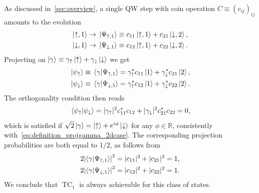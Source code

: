 \documentclass[
	aps, pra,
	superscriptaddress, twocolumn,
	floatfix,
	10pt
]{revtex4-1}
\newcommand{\on}[1]{\operatorname{#1}}
\newcommand{\parTitle}[1]{\noindent{\color{Mahogany}(\emph{#1})}}
\newcommand{\RR}{\mathbb{R}}
\newcommand{\calW}{{\mathcal{W}}}
\begin{document}
\parTitle{Single step}
As discussed in~\cref{sec:overview}, a single QW step with coin operation  $C\equiv (c_{ij})_{ij}$ amounts to the evolution
\begin{equation}
\begin{aligned}
	\ket{\uparrow,1} &\rightarrow \ket*{\Psi_{\uparrow,1}} \equiv c_{11}\ket{\uparrow,1} + c_{21}\ket{\downarrow,2}, \\
	\ket{\downarrow,1} &\rightarrow \ket*{\Psi_{\downarrow,1}} \equiv c_{12}\ket{\uparrow,1} + c_{22}\ket{\downarrow,2}.
\end{aligned}
\end{equation}
Projecting on $\ket\gamma\equiv \gamma_\uparrow\ket\uparrow+\gamma_\downarrow\ket\downarrow$ we get
\begin{equation}
\begin{aligned}
	\ket*{\psi_\uparrow} \equiv  \braket*{\gamma}{\Psi_{\uparrow,1}} &= \gamma_\uparrow^*c_{11}\ket1 + \gamma_\downarrow^* c_{21}\ket2, \\
	\ket*{\psi_\downarrow} \equiv  \braket*{\gamma}{\Psi_{\downarrow,1}} &= \gamma_\uparrow^* c_{12} \ket1 + \gamma_\downarrow^* c_{22} \ket2.
\end{aligned}
\end{equation}
The orthogonality condition then reads
\begin{equation}
\begin{gathered}
	\braket*{\psi_\uparrow}{\psi_\downarrow}
	= |\gamma_\uparrow|^2 c_{11}^* c_{12} + |\gamma_\downarrow|^2 c_{21}^* c_{22} = 0,
\end{gathered}
\end{equation}
which is satisfied if $\sqrt2\ket\gamma = \ket\uparrow + e^{i\phi}\ket\downarrow$ for any $\phi\in\RR$, consistently with~\cref{eq:definition_projgamma_2dcase}.
The corresponding projection probabilities are both equal to $1/2$, as follows from
\begin{equation}
\begin{aligned}
	2\abs{\braket{\gamma}{\Psi_{\uparrow,1}}}^2 &= |c_{11}|^2 + |c_{21}|^2 = 1, \\
	2\abs{\braket{\gamma}{\Psi_{\downarrow,1}}}^2 &= |c_{12}|^2 + |c_{22}|^2 = 1.
\end{aligned}
\end{equation}
We conclude that $\on{TC}_1$ is always achievable for this class of states.
\end{document}
